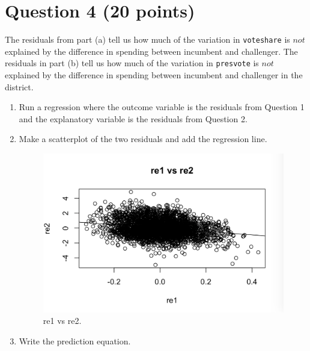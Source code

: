 \documentclass[12pt,letterpaper]{article}
\begin{document}
\section*{Question 4 (20 points)}
\noindent The residuals from part (a) tell us how much of the variation in \texttt{voteshare} is $not$ explained by the difference in spending between incumbent and challenger. The residuals in part (b) tell us how much of the variation in \texttt{presvote} is $not$ explained by the difference in spending between incumbent and challenger in the district.
	\begin{enumerate}
		\item Run a regression where the outcome variable is the residuals from Question 1 and the explanatory variable is the residuals from Question 2.	
			  
		\item Make a scatterplot of the two residuals and add the regression line. 	
			  
				\begin{figure}[h!]
				\includegraphics[width=\linewidth]{PS34}
				\caption{re1 vs re2.}
				\label{fig:PS4}
			\end{figure}
		\item Write the prediction equation.
		  
	\end{enumerate}
	
	\newpage	
\end{document}

